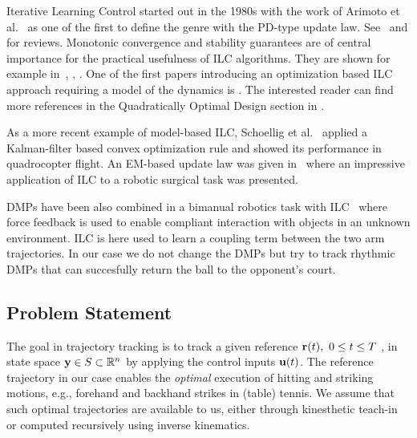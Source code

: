 Iterative Learning Control started out in the 1980s with the work of Arimoto et al.~\cite{Arimoto84} as one of the first to define the genre with the PD-type update law. See~\cite{Bristow06} and \cite{Moore99} for reviews. Monotonic convergence and stability guarantees are of central importance for the practical usefulness of ILC algorithms. They are shown for example in~\cite{Bristow06}, \cite{Norrloef02}, \cite{Longman2000}. One of the first papers introducing an optimization based ILC approach requiring a model of the dynamics is \cite{Amann95}. The interested reader can find more references in the Quadratically Optimal Design section in \cite{Bristow06}.

As a more recent example of model-based ILC, Schoellig et al.~\cite{Schoellig12} applied a Kalman-filter based convex optimization rule and showed its performance in quadrocopter flight. An EM-based update law was given in~\cite{Berg10} where an impressive application of ILC to a robotic surgical task was presented.

DMPs have been also combined in a bimanual robotics task with ILC~\cite{Gams13} where force feedback is used to enable compliant interaction with objects in an unknown environment. ILC is here used to learn a coupling term between the two arm trajectories. In our case we do not change the DMPs but try to track rhythmic DMPs that can succesfully return the ball to the opponent's court.

\subsection{Problem Statement}\label{problemStatement}

The goal in trajectory tracking is to track a given reference $\boldsymbol{\mathrm{r}}(t), \ 0 \leq t \leq T \ $, in state space $\boldsymbol{\mathrm{y}} \in S \subset \mathbb{R}^{n}$ by applying the control inputs $\boldsymbol{\mathrm{u}}(t)$. The reference trajectory in our case enables the \emph{optimal} execution of hitting and striking motions, e.g., forehand and backhand strikes in (table) tennis. We assume that such optimal trajectories are available to us, either through kinesthetic teach-in or computed recursively using inverse kinematics.

